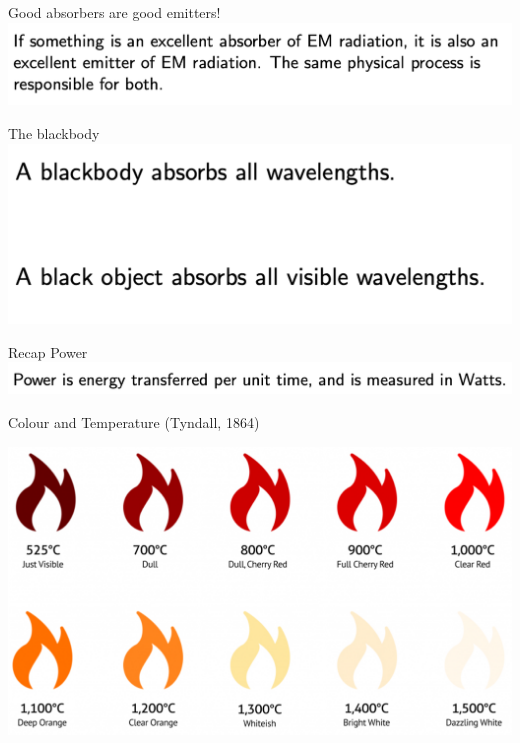 \begin{frame}{Good absorbers are good emitters!}
\small
\includegraphics[scale=0.35]{absorb}
\end{frame}


\begin{frame}{The blackbody}
\small
\includegraphics[scale=0.35]{bb-note}
\end{frame}

\begin{frame}{Recap Power}
\small
\includegraphics[scale=0.35]{power}
\end{frame}

\begin{frame}{Colour and Temperature (Tyndall, 1864)}
\small

\includegraphics[scale=0.35]{fire}
\end{frame}

